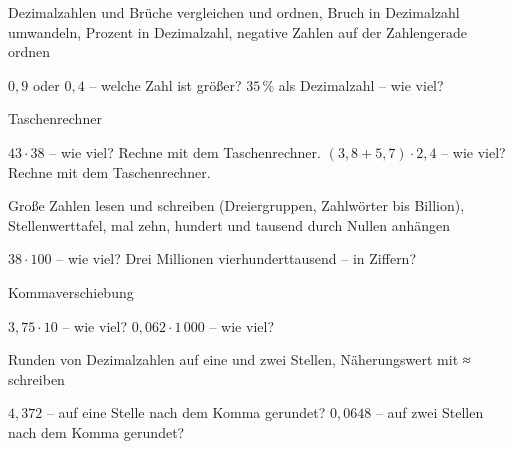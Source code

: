 \begin{aufgabe}{Dezimalzahlen und Brüche vergleichen und ordnen, Bruch in Dezimalzahl umwandeln, Prozent in Dezimalzahl, negative Zahlen auf der Zahlengerade ordnen}
\begin{teile}
\teil $0{,}9$ oder $0{,}4$ – welche Zahl ist größer? \leerfeld
\teil $35\,\%$ als Dezimalzahl – wie viel? \leerfeld
\end{teile}
\end{aufgabe}

\begin{aufgabe}{Taschenrechner}
\begin{teile}
\teil $43 \cdot 38$ – wie viel? Rechne mit dem Taschenrechner. \leerfeld
\teil $(3{,}8 + 5{,}7) \cdot 2{,}4$ – wie viel? Rechne mit dem Taschenrechner. \leerfeld
\end{teile}
\end{aufgabe}

\begin{aufgabe}{Große Zahlen lesen und schreiben (Dreiergruppen, Zahlwörter bis Billion), Stellenwerttafel, mal zehn, hundert und tausend durch Nullen anhängen}
\begin{teile}
\teil $38 \cdot 100$ – wie viel? \leerfeld
\teil Drei Millionen vierhunderttausend – in Ziffern? \leerfeld
\end{teile}
\end{aufgabe}

\begin{aufgabe}{Kommaverschiebung}
\begin{teile}
\teil $3{,}75 \cdot 10$ – wie viel? \leerfeld
\teil $0{,}062 \cdot 1\,000$ – wie viel? \leerfeld
\end{teile}
\end{aufgabe}

\begin{aufgabe}{Runden von Dezimalzahlen auf eine und zwei Stellen, Näherungswert mit ≈ schreiben}
\begin{teile}
\teil $4{,}372$ – auf eine Stelle nach dem Komma gerundet? \leerfeld
\teil $0{,}0648$ – auf zwei Stellen nach dem Komma gerundet? \leerfeld
\end{teile}
\end{aufgabe}

